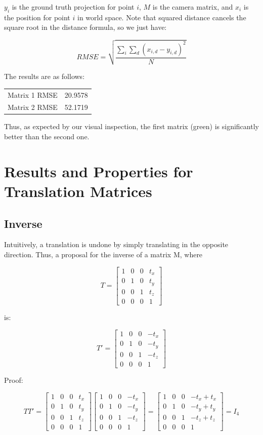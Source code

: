 \documentclass{article}
\begin{document}
$y_i$ is the ground truth projection for point $i$, $ M $ is the camera 
matrix, and $x_i$ is the position for point $i$ in world space. Note that 
squared distance cancels the square root in the distance formula, so we just 
have:

$$
RMSE = \sqrt{\frac{\sum_i \sum_d (x_{i,d} - y_{i, d})^2}{N}}
$$

The results are as follows:

\begin{tabular}{r | r}
    Matrix 1 RMSE & 20.9578 \\
    Matrix 2 RMSE & 52.1719
\end{tabular}

Thus, as expected by our visual inspection, the first matrix (green) is 
significantly better than the second one.

\section{Results and Properties for Translation Matrices}

\subsection{Inverse}

Intuitively, a translation is undone by simply translating in the opposite 
direction. Thus, a proposal for the inverse of a matrix M, where

$$
T = \begin{bmatrix}
1 & 0 & 0 & t_x \\
0 & 1 & 0 & t_y \\
0 & 0 & 1 & t_z \\
0 & 0 & 0 & 1
\end{bmatrix}
$$

is:

$$
T' = \begin{bmatrix}
1 & 0 & 0 & -t_x \\
0 & 1 & 0 & -t_y \\
0 & 0 & 1 & -t_z \\
0 & 0 & 0 & 1
\end{bmatrix}
$$

Proof:

$$
T T' = \begin{bmatrix}
1 & 0 & 0 & t_x \\
0 & 1 & 0 & t_y \\
0 & 0 & 1 & t_z \\
0 & 0 & 0 & 1
\end{bmatrix} \begin{bmatrix}
1 & 0 & 0 & -t_x \\
0 & 1 & 0 & -t_y \\
0 & 0 & 1 & -t_z \\
0 & 0 & 0 & 1
\end{bmatrix} = \begin{bmatrix}
1 & 0 & 0 & -t_x + t_x \\
0 & 1 & 0 & -t_y + t_y \\
0 & 0 & 1 & -t_z + t_z \\
0 & 0 & 0 & 1
\end{bmatrix} = I_4
$$
\end{document}
